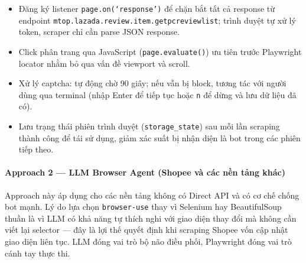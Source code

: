 \begin{itemize}[labelsep=10pt, leftmargin=2cm]
    \item Đăng ký listener \texttt{page.on(`response')} để chặn bắt tất cả response từ endpoint \texttt{mtop.lazada.review.item.getpcreviewlist}; trình duyệt tự xử lý token, scraper chỉ cần parse JSON response.
    \item Click phân trang qua JavaScript (\texttt{page.evaluate()}) ưu tiên trước Playwright locator nhằm bỏ qua vấn đề viewport và scroll.
    \item Xử lý captcha: tự động chờ 90 giây; nếu vẫn bị block, tương tác với người dùng qua terminal (nhập Enter để tiếp tục hoặc \texttt{n} để dừng và lưu dữ liệu đã có).
    \item Lưu trạng thái phiên trình duyệt (\texttt{storage\_state}) sau mỗi lần scraping thành công để tái sử dụng, giảm xác suất bị nhận diện là bot trong các phiên tiếp theo.
\end{itemize}

\paragraph{Approach 2 --- LLM Browser Agent (Shopee và các nền tảng khác)}

Approach này áp dụng cho các nền tảng không có Direct API và có cơ chế chống bot mạnh. Lý do lựa chọn \texttt{browser-use} thay vì Selenium hay BeautifulSoup thuần là vì LLM có khả năng tự thích nghi với giao diện thay đổi mà không cần viết lại selector --- đây là lợi thế quyết định khi scraping Shopee vốn cập nhật giao diện liên tục. LLM đóng vai trò bộ não điều phối, Playwright đóng vai trò cánh tay thực thi.

